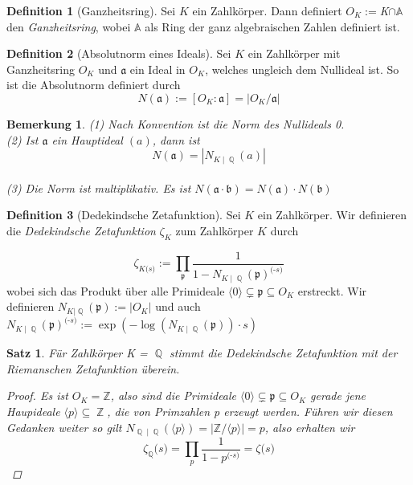 \documentclass[10pt,a4paper]{article}
\theoremstyle{plain}
\newtheorem{satz}[thm]{Satz}
\newtheorem*{note}{Bemerkung}
\theoremstyle{definition}
\newtheorem{defn}{Definition}[section]
\theoremstyle{remark}
\DeclareMathOperator{\Q}{\mathbb{Q}}
\DeclareMathOperator{\Z}{\mathbb{Z}}
\begin{document}
\begin{defn}[Ganzheitsring]

Sei $\textit{K}$ ein Zahlkörper. Dann definiert $O_{K} := $\textit{K}$ \cap \mathbb{A}$ den \textit{Ganzheitsring}, wobei $\mathbb{A}$ als Ring der ganz algebraischen Zahlen definiert ist.
\end{defn}

\begin{defn}[Absolutnorm eines Ideals]

Sei $\textit{K}$ ein Zahlkörper mit Ganzheitsring $O_{K}$ und $\mathfrak{a}$ ein Ideal in $O_{K}$, welches ungleich dem Nullideal ist. So ist die Absolutnorm definiert durch $$N(\mathfrak{a}) := [O_{K} : \mathfrak{a} ] = \vert O_{K} / \mathfrak{a} \vert $$

\end{defn}

\begin{note}
(1) Nach Konvention ist die Norm des Nullideals 0.
\\
(2) Ist $\mathfrak{a}$ ein Hauptideal $(a)$, dann ist $$N(\mathfrak{a}) = |N_{K\mid \Q}(a)|$$
\\
(3) Die Norm ist multiplikativ. Es ist $N(\mathfrak{a}\cdot \mathfrak{b}) = N(\mathfrak{a})\cdot N(\mathfrak{b})$

\end{note}

\begin{defn}[Dedekindsche Zetafunktion]

Sei $\textit{K}$ ein Zahlkörper. Wir definieren die \textit{Dedekindsche Zetafunktion} \textit{$\zeta_{\textit{K}}$} zum Zahlkörper $\textit{K}$ durch
	
$$\zeta_{\textit{K} \textit{(s)}}:= \prod_{\mathfrak{p}}\frac{1}{1- N_{\textit{K}\mid\Q}(\mathfrak{p})^\textit{(-s)}}$$
wobei sich das Produkt über alle Primideale $\langle0\rangle\subsetneq \mathfrak{p} \subseteq O_{\textit{K}}$ erstreckt. Wir definieren $N_{\textit{K}|\Q}(\mathfrak{p}) := | O_{\textit{K}}|$ und auch $N_{\textit{K}\mid\Q}(\mathfrak{p})^\textit{(-s)}:=\exp(-\log(N_{\textit{K}\mid\Q}(\mathfrak{p}))\cdot \textit{s})$

\end{defn}

\begin{satz}

Für Zahlkörper \textit{K} = $\Q$ stimmt die Dedekindsche Zetafunktion mit der Riemanschen Zetafunktion überein.

\begin{proof}
Es ist $O_\textit{K} = \mathbb{Z}$, also sind die Primideale $\langle0\rangle\subsetneq \mathfrak{p} \subseteq O_{\textit{K}}$ gerade jene Haupideale $\langle \textit{p}\rangle\subseteq\Z$, die von Primzahlen \textit{p} erzeugt werden. Führen wir diesen Gedanken weiter so gilt $N_{\Q\mid\Q}(\langle \textit{p}\rangle) = | \mathbb{Z}/\langle \textit{p}\rangle| = \textit{p}$, also erhalten wir  $$\zeta_{\Q} \textit{(s)}= \prod_{\textit{p}} \frac{1}{1-\textit{p}^\textit{(-s)}} = \zeta \textit{(s)} $$

\end{proof}

\end{satz}
\end{document}
